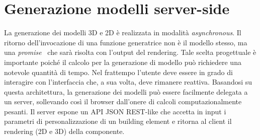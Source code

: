 \section{Generazione modelli server-side}
\label{sec:chapter_3_section_4}

\noindent
La generazione dei modelli 3D e 2D è realizzata in modalità \emph{asynchronous}.
Il ritorno dell'invocazione di una funzione generatrice non \`e il modello stesso,
ma una \emph{promise}~\cite{promisejs} che sarà risolta con l'output del rendering.
Tale scelta progettuale \`e importante poich\'e il calcolo per la
generazione di modello pu\`o richiedere una notevole quantità di tempo.
Nel frattempo l'utente deve essere in grado di interagire con l'interfaccia che, a sua volta, deve rimanere reattiva.
Basandosi su questa architettura, la generazione dei modelli può essere facilmente delegata a un server,
sollevando così il browser dall'onere di calcoli computazionalmente pesanti. Il server espone un API JSON REST-like
che accetta in input i parametri di personalizzazione di un building element e ritorna al client il rendering (2D e 3D) della componente.


\newpage
